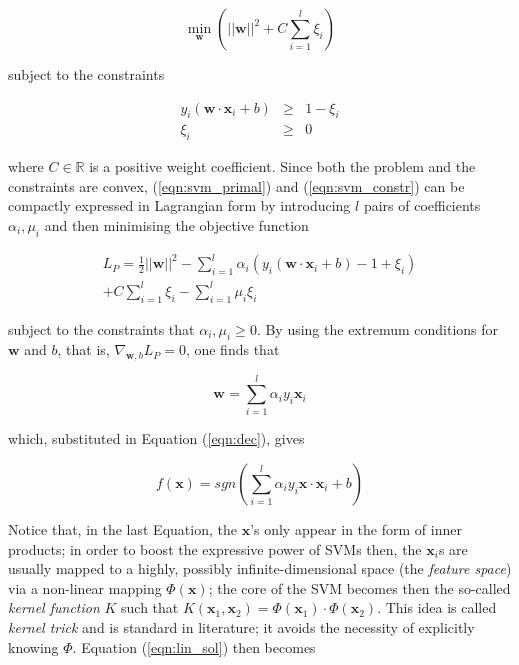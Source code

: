 \documentclass[10pt,twocolumn,letterpaper]{article}
\def\RR{\mathbb{R}}
\def\xx{\mathbf{x}}
\def\ww{\mathbf{w}}
\begin{document}
\begin{equation} \label{eqn:svm_primal}
  \min_{\ww} \left( ||\ww||^2 + C \sum_{i=1}^l \xi_i \right)
\end{equation}

subject to the constraints

\begin{eqnarray} \label{eqn:svm_constr}
  y_i (\ww\cdot\xx_i + b) & \geq & 1-\xi_i \\
                    \xi_i & \geq & 0 \nonumber
\end{eqnarray}

where $C \in \RR$ is a positive weight coefficient. Since both the
problem and the constraints are convex, (\ref{eqn:svm_primal}) and
(\ref{eqn:svm_constr}) can be compactly expressed in Lagrangian form
by introducing $l$ pairs of coefficients $\alpha_i, \mu_i$ and then
minimising the objective function

\begin{eqnarray} \label{eqn:lp1}
  L_P =
      \frac{1}{2} ||\ww||^2
    - \sum_{i=1}^l \alpha_i \left(y_i (\ww\cdot\xx_i+b) - 1 + \xi_i \right) \\
    + C \sum_{i=1}^l \xi_i - \sum_{i=1}^l \mu_i \xi_i \nonumber
\end{eqnarray}

subject to the constraints that $\alpha_i,\mu_i\geq 0$. By using the
extremum conditions for $\ww$ and $b$, that is, $\nabla_{\ww,b} L_P =
0$, one finds that

\begin{equation} \label{eqn:w1}
  \ww = \sum_{i=1}^l \alpha_i y_i \xx_i
\end{equation}

which, substituted in Equation (\ref{eqn:dec}), gives

\begin{equation} \label{eqn:lin_sol}
  f(\xx) = sgn \left( \sum_{i=1}^l \alpha_i y_i \xx \cdot \xx_i + b \right)
\end{equation}

Notice that, in the last Equation, the $\xx$'s only appear in the form
of inner products; in order to boost the expressive power of SVMs
then, the $\xx_i$s are usually mapped to a highly, possibly
infinite-dimensional space (the \emph{feature space}) via a
non-linear mapping $\Phi(\xx)$; the core of the SVM becomes then the
so-called \emph{kernel function} $K$ such that $K(\xx_1,\xx_2) =
\Phi(\xx_1)\cdot\Phi(\xx_2)$. This idea is called \emph{kernel trick}
and is standard in literature; it avoids the necessity of explicitly
knowing $\Phi$. Equation (\ref{eqn:lin_sol}) then becomes
\end{document}

